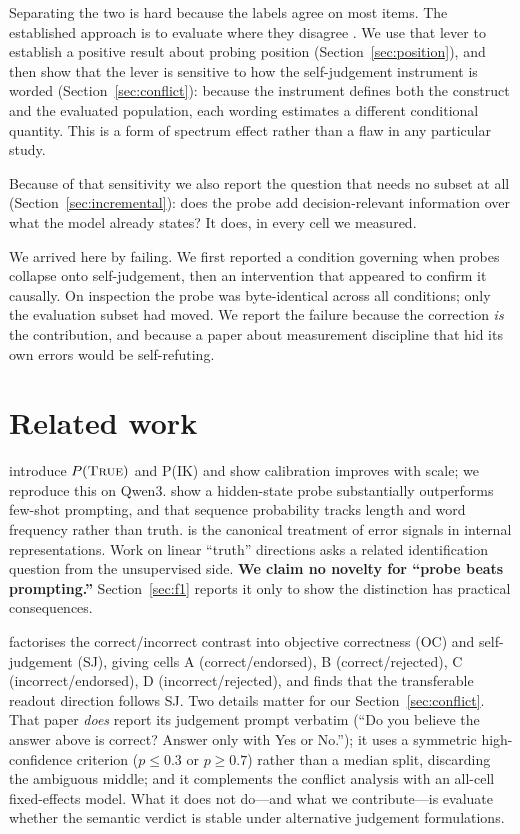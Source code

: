 \documentclass[10pt]{article}
\newcommand{\ptrue}{P(\textsc{True})}
\begin{document}
Separating the two is hard because the labels agree on most items. The established approach is to
evaluate where they disagree \citep{diagnosing2026,masked2026}. We use that lever to establish a
positive result about probing position (Section~\ref{sec:position}), and then show that the lever is
sensitive to how the self-judgement instrument is worded (Section~\ref{sec:conflict}): because the
instrument defines both the construct and the evaluated population, each wording estimates a
different conditional quantity. This is a form of spectrum effect
\citep{ransohoff1978spectrum,hernan2004selection} rather than a flaw in any particular study.

Because of that sensitivity we also report the question that needs no subset at all
(Section~\ref{sec:incremental}): does the probe add decision-relevant information over what the
model already states? It does, in every cell we measured.

We arrived here by failing. We first reported a condition governing when probes collapse onto
self-judgement, then an intervention that appeared to confirm it causally. On inspection the probe
was byte-identical across all conditions; only the evaluation subset had moved. We report the
failure because the correction \emph{is} the contribution, and because a paper about measurement
discipline that hid its own errors would be self-refuting.

\section{Related work}

\citet{kadavath2022} introduce $\ptrue{}$ and P(IK) and show calibration improves with scale; we
reproduce this on Qwen3. \citet{azaria2023internal} show a hidden-state probe substantially
outperforms few-shot prompting, and that sequence probability tracks length and word frequency
rather than truth. \citet{orgad2024llms} is the canonical treatment of error signals in internal
representations. Work on linear ``truth'' directions \citep{burns2023discovering,marks2024geometry}
asks a related identification question from the unsupervised side. \textbf{We claim no novelty for
``probe beats prompting.''} Section~\ref{sec:f1} reports it only to show the distinction has
practical consequences.

\citet{diagnosing2026} factorises the correct/incorrect contrast into objective correctness (OC) and
self-judgement (SJ), giving cells A (correct/endorsed), B (correct/rejected), C
(incorrect/endorsed), D (incorrect/rejected), and finds that the transferable readout direction
follows SJ. Two details matter for our Section~\ref{sec:conflict}. That paper \emph{does} report its
judgement prompt verbatim (``Do you believe the answer above is correct? Answer only with Yes or
No.''); it uses a symmetric high-confidence criterion ($p \le 0.3$ or $p \ge 0.7$) rather than a
median split, discarding the ambiguous middle; and it complements the conflict analysis with an
all-cell fixed-effects model. What it does not do---and what we contribute---is evaluate whether the
semantic verdict is stable under alternative judgement formulations.
\end{document}
